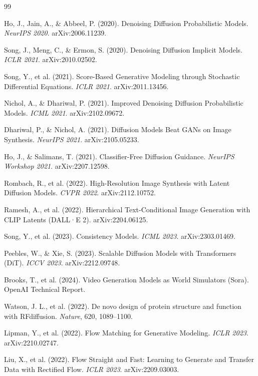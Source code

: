\documentclass[11pt, a4paper]{article}
\theoremstyle{definition}
\begin{document}
\begingroup
\renewcommand{\section}[2]{}
\begin{thebibliography}{99}

  Ho, J., Jain, A., \& Abbeel, P. (2020).
  Denoising Diffusion Probabilistic Models.
  \textit{NeurIPS 2020}. arXiv:2006.11239.

  Song, J., Meng, C., \& Ermon, S. (2020).
  Denoising Diffusion Implicit Models.
  \textit{ICLR 2021}. arXiv:2010.02502.

  Song, Y., et al. (2021).
  Score-Based Generative Modeling through Stochastic Differential Equations.
  \textit{ICLR 2021}. arXiv:2011.13456.

  Nichol, A., \& Dhariwal, P. (2021).
  Improved Denoising Diffusion Probabilistic Models.
  \textit{ICML 2021}. arXiv:2102.09672.

  Dhariwal, P., \& Nichol, A. (2021).
  Diffusion Models Beat GANs on Image Synthesis.
  \textit{NeurIPS 2021}. arXiv:2105.05233.

  Ho, J., \& Salimans, T. (2021).
  Classifier-Free Diffusion Guidance.
  \textit{NeurIPS Workshop 2021}. arXiv:2207.12598.

  Rombach, R., et al. (2022).
  High-Resolution Image Synthesis with Latent Diffusion Models.
  \textit{CVPR 2022}. arXiv:2112.10752.

  Ramesh, A., et al. (2022).
  Hierarchical Text-Conditional Image Generation with CLIP Latents (DALL·E 2).
  arXiv:2204.06125.

  Song, Y., et al. (2023).
  Consistency Models.
  \textit{ICML 2023}. arXiv:2303.01469.

  Peebles, W., \& Xie, S. (2023).
  Scalable Diffusion Models with Transformers (DiT).
  \textit{ICCV 2023}. arXiv:2212.09748.

  Brooks, T., et al. (2024).
  Video Generation Models as World Simulators (Sora).
  OpenAI Technical Report.

  Watson, J. L., et al. (2022).
  De novo design of protein structure and function with RFdiffusion.
  \textit{Nature}, 620, 1089--1100.

  Lipman, Y., et al. (2022).
  Flow Matching for Generative Modeling.
  \textit{ICLR 2023}. arXiv:2210.02747.

  Liu, X., et al. (2022).
  Flow Straight and Fast: Learning to Generate and Transfer Data with Rectified Flow.
  \textit{ICLR 2023}. arXiv:2209.03003.

\end{thebibliography}
\endgroup
\end{document}
